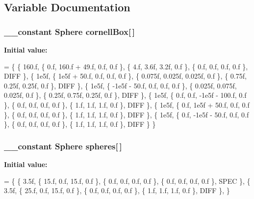 \subsection{Variable Documentation}
\hypertarget{PathTracer_8cl_a31f3f434b7447198473191c794da0659}{
\subsubsection[{cornell\-Box}]{\setlength{\rightskip}{0pt plus 5cm}\-\_\-\-\_\-constant {\bf Sphere} cornell\-Box\mbox{[}$\,$\mbox{]}}}\label{PathTracer_8cl_a31f3f434b7447198473191c794da0659}
{\bfseries Initial value\-:}
\begin{DoxyCode}
=
\{
    \{ 160.f, \{ 0.f, 160.f + 49.f, 0.f, 0.f \}, \{ 4.f, 3.6f, 3.2f, 0.f \}, \{ 0.f, 0.f, 0.f, 0.f \}, DIFF \}, 
    \{ 1e5f, \{ 1e5f + 50.f, 0.f, 0.f, 0.f \}, \{ 0.075f, 0.025f, 0.025f, 0.f \}, \{ 0.75f, 0.25f, 0.25f, 0.f \}, 
      DIFF \}, 
    \{ 1e5f, \{ -1e5f - 50.f, 0.f, 0.f, 0.f \}, \{ 0.025f, 0.075f, 0.025f, 0.f \}, \{ 0.25f, 0.75f, 0.25f, 0.f \},
       DIFF \}, 
    \{ 1e5f, \{ 0.f, 0.f, -1e5f - 100.f, 0.f \}, \{ 0.f, 0.f, 0.f, 0.f \}, \{ 1.f, 1.f, 1.f, 0.f \}, DIFF \}, 
    \{ 1e5f, \{ 0.f, 1e5f + 50.f, 0.f, 0.f \}, \{ 0.f, 0.f, 0.f, 0.f \}, \{ 1.f, 1.f, 1.f, 0.f \}, DIFF \}, 
    \{ 1e5f, \{ 0.f, -1e5f - 50.f, 0.f, 0.f \}, \{ 0.f, 0.f, 0.f, 0.f \}, \{ 1.f, 1.f, 1.f, 0.f \}, DIFF \} 
\}
\end{DoxyCode}
\hypertarget{PathTracer_8cl_aca5b8ab7e4ead122457254e2678c4f7e}{
\subsubsection[{spheres}]{\setlength{\rightskip}{0pt plus 5cm}\-\_\-\-\_\-constant {\bf Sphere} spheres\mbox{[}$\,$\mbox{]}}}\label{PathTracer_8cl_aca5b8ab7e4ead122457254e2678c4f7e}
{\bfseries Initial value\-:}
\begin{DoxyCode}
=
\{
    \{ 3.5f, \{ 15.f, 0.f, 15.f, 0.f \}, \{ 0.f, 0.f, 0.f, 0.f \}, \{ 0.f, 0.f, 0.f, 0.f \}, SPEC \}, 
    \{ 3.5f, \{ 25.f, 0.f, 15.f, 0.f \}, \{ 0.f, 0.f, 0.f, 0.f \}, \{ 1.f, 1.f, 1.f, 0.f \}, DIFF \}, 
\}
\end{DoxyCode}
